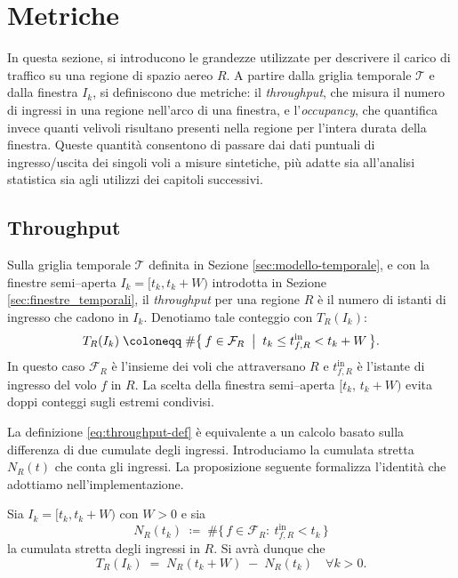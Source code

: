 \section{Metriche}
In questa sezione, si introducono le grandezze utilizzate per descrivere il carico di traffico su una regione di spazio aereo \(R\).  
A partire dalla griglia temporale \(\mathcal{T}\) e dalla finestra \(I_k\), si definiscono due metriche: il \emph{throughput}, che misura il numero di ingressi in una regione nell’arco di una finestra, e l’\emph{occupancy}, che quantifica invece quanti velivoli risultano presenti nella regione per l’intera durata della finestra. Queste quantità consentono di passare dai dati puntuali di ingresso/uscita dei singoli voli a misure sintetiche, più adatte sia all’analisi statistica sia agli utilizzi dei capitoli successivi.
\label{sec:metriche}
\subsection{Throughput}
\label{subsec:throughput-teoria}
Sulla griglia temporale \(\mathcal{T}\) definita in Sezione \ref{sec:modello-temporale}, e con la finestre semi–aperta \(I_k=[t_k,t_k+W)\) introdotta in Sezione \ref{sec:finestre_temporali}, il \emph{throughput} per una regione \(R\) è il numero di istanti di ingresso che cadono in \(I_k\).
    Denotiamo tale conteggio con \(T_R(I_k)\):
    \begin{equation}
    \label{eq:throughput-def}
        T_R(I_k)\;\coloneqq\; \#\bigl\{\, f \in \mathcal{F}_R \;\bigm|\; t_k \le t^{\mathrm{in}}_{f,R} < t_k+W \,\bigr\}.
    \end{equation}
    In questo caso \(\mathcal{F}_R\) è l’insieme dei voli che attraversano \(R\) e \(t^{\mathrm{in}}_{f,R}\) è l’istante di ingresso del volo \(f\) in \(R\).
    La scelta della finestra semi–aperta \([t_k,\,t_k+W)\) evita doppi conteggi sugli estremi condivisi.

    \clearpage
    
    
    \noindent La definizione \eqref{eq:throughput-def} è equivalente a un calcolo basato sulla differenza di due cumulate degli ingressi. Introduciamo la cumulata stretta $N_R(t)$ che conta gli ingressi. La proposizione seguente formalizza l’identità che adottiamo nell’implementazione.
    
    \begin{proposition}
    \label{prop:two-cumulatives}
    Sia $I_k=[t_k,t_k+W)$ con $W>0$ e sia
    \[
    N_R(t_k)\;\coloneqq\;\#\bigl\{\,f\in\mathcal{F}_R:\ t^{\mathrm{in}}_{f,R}<t_k\,\bigr\}
    \]
    la cumulata stretta degli ingressi in $R$. Si avrà dunque che
    \begin{equation}
    \label{eq:throughput-diff-cumulate}
    T_R(I_k)\;=\;N_R(t_k{+}W)\;-\;N_R(t_k)\quad\forall{k}>0.
    \end{equation}
    \end{proposition}
    
